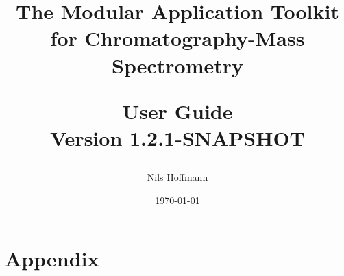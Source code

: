 \documentclass[10pt,a4paper,onecolumn,twoside,titlepage,headsepline,open=any]{scrbook}
\author{Nils Hoffmann}
\title{The Modular Application Toolkit for Chromatography-Mass Spectrometry\\\vspace{1ex}\begin{Large}
User Guide\\
Version 1.2.1-SNAPSHOT
\end{Large}}
\date{\today}
\begin{document}
\frontmatter    %
\maketitle       %





\tableofcontents   %
 
\mainmatter    %




\backmatter
\chapter{Appendix}
\lstlistoflistings
\printglossaries
\end{document}
